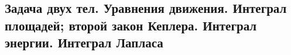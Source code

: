 

\subsection{Задача двух тел. Уравнения движения. Интеграл площадей; второй закон Кеплера. Интеграл энергии. Интеграл Лапласа}



